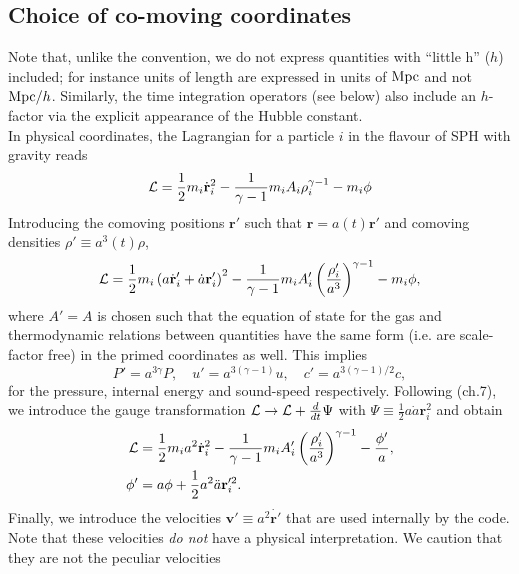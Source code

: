 \subsection{Choice of co-moving coordinates}
\label{ssec:ccordinates}

Note that, unlike the \gadget convention, we do not express quantities with
``little h'' ($h$) included; for instance units of length are expressed in
units of $\rm{Mpc}$ and not ${\rm{Mpc}}/h$. Similarly, the time integration
operators (see below) also include an $h$-factor via the explicit appearance of
the Hubble constant.\\
In physical coordinates, the Lagrangian for a particle $i$ in the
\cite{Springel2002} flavour of SPH with gravity reads
\begin{equation}
  \mathcal{L} =
  \frac{1}{2} m_i \dot{\mathbf{r}}_i^2 -
  \frac{1}{\gamma-1}m_iA_i\rho_i^{\gamma-1} -
  m_i \phi
\end{equation}
Introducing the comoving positions $\mathbf{r}'$ such that $\mathbf{r}
= a(t) \mathbf{r}'$ and comoving densities $\rho' \equiv a^3(t)\rho$,
\begin{equation}
  \mathcal{L} =
  \frac{1}{2} m_i \left(a\dot{\mathbf{r}}_i' + \dot{a}\mathbf{r}_i'
  \right)^2 - 
  \frac{1}{\gamma-1}m_iA_i'\left(\frac{\rho_i'}{a^3}\right)^{\gamma-1}
  - m_i \phi,
\end{equation}
where $A'=A$ is chosen such that the equation of state for
the gas and thermodynamic relations between quantities have the same
form (i.e. are scale-factor free) in the primed coordinates as
well. This implies
\begin{equation}
  P' = a^{3\gamma}P,\quad u'=a^{3(\gamma-1)}u, \quad c'=a^{3(\gamma-1)/2}c,
\end{equation}
for the pressure, internal energy and sound-speed
respectively. Following \cite{Peebles1980} (ch.7), we introduce the
gauge transformation $\mathcal{L} \rightarrow \mathcal{L} + \frac{d}{dt}\Psi$ with
$\Psi \equiv \frac{1}{2}a\dot{a}\mathbf{r}_i^2$ and obtain
\begin{align}
  \mathcal{L} &= \frac{1}{2}m_ia^2 \dot{\mathbf{r}}_i^2 -
  \frac{1}{\gamma-1}m_iA_i'\left(\frac{\rho_i'}{a^3}\right)^{\gamma-1}
  -\frac{\phi'}{a},\\
  \phi' &= a\phi + \frac{1}{2}a^2\ddot{a}\mathbf{r}_i'^2.\nonumber
\end{align}
Finally, we introduce the velocities
$\mathbf{v}' \equiv a^2\dot{\mathbf{r}'}$ that are used internally by
the code. Note that these velocities \emph{do not} have a physical
interpretation. We caution that they are not the peculiar velocities
